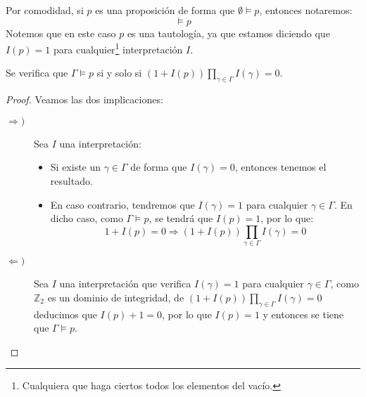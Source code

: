 \begin{notacion}
    Por comodidad, si $p$ es una proposición de forma que $\emptyset \vDash p$, entonces notaremos:
    \begin{equation*}
        \vDash p
    \end{equation*}
    Notemos que en este caso $p$ es una tautología, ya que estamos diciendo que $I(p)=1$ para cualquier\footnote{Cualquiera que haga ciertos todos los elementos del vacío.} interpretación $I$.
\end{notacion}

\begin{prop}
    Se verifica que $\Gamma\vDash p$ si y solo si $(1+I(p))\displaystyle\prod_{\gamma\in \Gamma}I(\gamma) = 0$.
    \begin{proof}
        Veamos las dos implicaciones:
    \begin{description}
        \item [$\Longrightarrow)$] 
            Sea $I$ una interpretación:
            \begin{itemize}
                \item Si existe un $\gamma\in \Gamma$ de forma que $I(\gamma)=0$, entonces tenemos el resultado.
                \item En caso contrario, tendremos que $I(\gamma)=1$ para cualquier $\gamma\in \Gamma$. En dicho caso, como $\Gamma\vDash p$, se tendrá que $I(p)=1$, por lo que:
                    \begin{equation*}
                        1 + I(p) = 0 \Longrightarrow (1+I(p))\displaystyle\prod_{\gamma\in \Gamma}I(\gamma) = 0
                    \end{equation*}
            \end{itemize}
        \item [$\Longleftarrow)$] 
            Sea $I$ una interpretación que verifica $I(\gamma)=1$ para cualquier $\gamma\in \Gamma$, como $\mathbb{Z}_2$ es un dominio de integridad, de $(1+I(p))\displaystyle\prod_{\gamma\in \Gamma}I(\gamma) = 0$ deducimos que $I(p) +1=0$, por lo que $I(p) = 1$ y entonces se tiene que $\Gamma\vDash p$.
    \end{description}
    \end{proof}
\end{prop}

